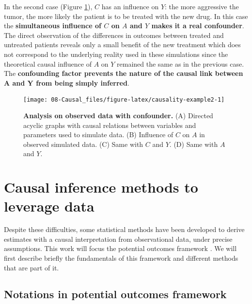 \documentclass[a4paper,12pt,twoside,onecolumn,openright,final,oldfontcommands]{memoir}
\begin{document}
In the second case (Figure \ref{fig:causality-example2}), \(C\) has an
influence on \(Y\): the more aggressive the tumor, the more likely the
patient is to be treated with the new drug. In this case the
\textbf{simultaneous influence of \(C\) on \(A\) and \(Y\) makes it a
real confounder}. The direct observation of the differences in outcomes
between treated and untreated patients reveals only a small benefit of
the new treatment which does not correspond to the underlying reality
used in these simulations since the theoretical causal influence of
\(A\) on \(Y\) remained the same as in the previous case. The
\textbf{confounding factor prevents the nature of the causal link
between A and Y from being simply inferred}.

\begin{figure}

{\centering \texttt{[image: 08-Causal\_files/figure-latex/causality-example2-1]} 

}

\caption[Analysis on observed data with confounder]{\textbf{Analysis on observed data with
confounder.} (A) Directed acyclic graphs with causal relations between
variables and parameters used to simulate data. (B) Influence of \(C\)
on \(A\) in observed simulated data. (C) Same with \(C\) and \(Y\). (D)
Same with \(A\) and \(Y\).}\label{fig:causality-example2}
\end{figure}







\section{Causal inference methods to leverage
data}\label{causal-inference-methods-to-leverage-data}

Despite these difficulties, some statistical methods have been developed
to derive estimates with a causal interpretation from observational
data, under precise assumptions. This work will focus the potential
outcomes framework \citep{rubin1974estimating}. We will first describe
briefly the fundamentals of this framework and different methods that
are part of it.

\subsection{Notations in potential outcomes
framework}\label{notations-in-potential-outcomes-framework}
\end{document}
